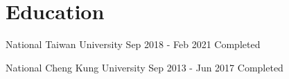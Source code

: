 \section{Education}

	{National Taiwan University}
	{Sep 2018 - Feb 2021}
	{Completed}

	{National Cheng Kung University}
	{Sep 2013 - Jun 2017}
	{Completed}

